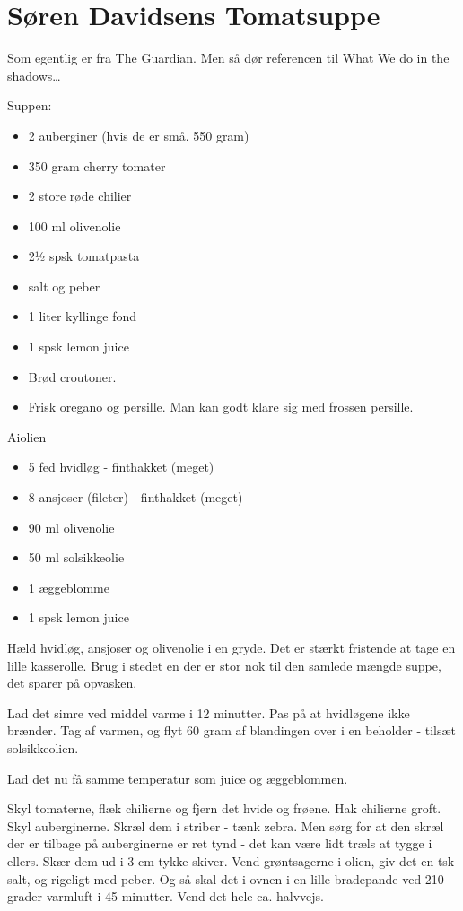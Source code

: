 \documentclass[
]{book}
\providecommand{\tightlist}{%
  \setlength{\itemsep}{0pt}\setlength{\parskip}{0pt}}
\begin{document}
\hypertarget{suxf8ren-davidsens-tomatsuppe}{%
\section{Søren Davidsens Tomatsuppe}\label{suxf8ren-davidsens-tomatsuppe}}

Som egentlig er fra The Guardian.
Men så dør referencen til What We do in the shadows\ldots{}

Suppen:

\begin{itemize}
\tightlist
\item
  2 auberginer (hvis de er små. 550 gram)
\item
  350 gram cherry tomater
\item
  2 store røde chilier
\item
  100 ml olivenolie
\item
  2½ spsk tomatpasta
\item
  salt og peber
\item
  1 liter kyllinge fond
\item
  1 spsk lemon juice
\item
  Brød croutoner.
\item
  Frisk oregano og persille. Man kan godt klare sig med frossen persille.
\end{itemize}

Aiolien

\begin{itemize}
\tightlist
\item
  5 fed hvidløg - finthakket (meget)
\item
  8 ansjoser (fileter) - finthakket (meget)
\item
  90 ml olivenolie
\item
  50 ml solsikkeolie
\item
  1 æggeblomme
\item
  1 spsk lemon juice
\end{itemize}

Hæld hvidløg, ansjoser og olivenolie i en gryde. Det er stærkt fristende at tage
en lille kasserolle. Brug i stedet en der er stor nok til
den samlede mængde suppe, det sparer på opvasken.

Lad det simre ved middel varme i 12 minutter. Pas på at hvidløgene ikke brænder.
Tag af varmen, og flyt 60 gram af blandingen over i en beholder - tilsæt solsikkeolien.

Lad det nu få samme temperatur som juice og æggeblommen.

Skyl tomaterne, flæk chilierne og fjern det hvide og frøene. Hak chilierne
groft.
Skyl auberginerne. Skræl dem i striber - tænk zebra. Men sørg for at den skræl
der er tilbage på auberginerne er ret tynd - det kan være lidt træls at tygge i
ellers. Skær dem ud i 3 cm tykke skiver. Vend grøntsagerne i olien, giv det en
tsk salt, og rigeligt med peber. Og så skal det i ovnen i en lille bradepande
ved 210 grader varmluft i 45 minutter. Vend det hele ca. halvvejs.
\end{document}
